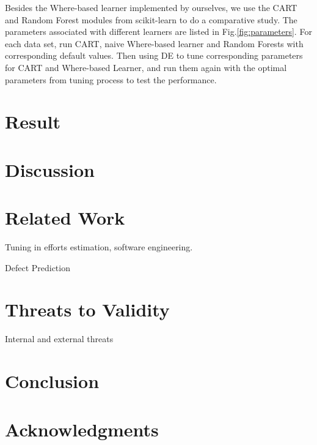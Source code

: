 \documentclass{sig-alternative}
\begin{document}
Besides the Where-based learner implemented by ourselves,  we use the CART and Random Forest modules 
from scikit-learn \cite{scikit-learn} to do a comparative study. The parameters associated with different learners are listed in Fig.\ref{fig:parameters}. For each data set, run CART, naive Where-based learner and Random Forests with corresponding default values. Then using DE to tune corresponding parameters for CART and Where-based Learner,  and run them again with the optimal parameters from tuning process to test the performance. 

\section{Result}


 
\section{Discussion}

\section{Related Work}

Tuning in efforts estimation, software engineering.

Defect Prediction



\section{Threats to Validity}

Internal and external threats

\section{Conclusion}

\section{Acknowledgments}
\end{document}
